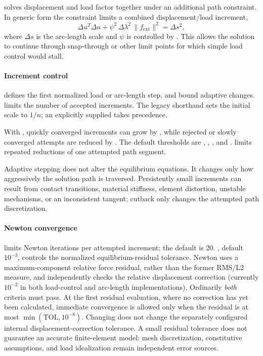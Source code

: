  solves displacement and load factor together under an additional path constraint. In generic form the constraint limits a combined displacement/load increment,
\[
\Delta u^T\Delta u
+\psi^2\,\Delta\lambda^2\,\|f_\mathrm{ext}\|^2
=\Delta s^2,
\]
where \(\Delta s\) is the arc-length scale and \(\psi\) is controlled by . This allows the solution to continue through snap-through or other limit points for which simple load control would stall.

\paragraph*{Increment control}

 defines the first normalized load or arc-length step.  and  bound adaptive changes.  limits the number of accepted increments. The legacy  shorthand sets the initial scale to \(1/n\); an explicitly supplied  takes precedence.

With , quickly converged increments can grow by , while rejected or slowly converged attempts are reduced by . The default thresholds are , , , and .  limits repeated reductions of one attempted path segment.

Adaptive stepping does not alter the equilibrium equations. It changes only how aggressively the solution path is traversed. Persistently small increments can result from contact transitions, material stiffness, element distortion, unstable mechanisms, or an inconsistent tangent; cutback only changes the attempted path discretization.

\paragraph*{Newton convergence}

 limits Newton iterations per attempted increment; the default is 20. , default \(10^{-3}\), controls the normalized equilibrium-residual tolerance. Newton uses a maximum-component relative force residual, rather than the former RMS/L2 measure, and independently checks the relative displacement correction (currently \(10^{-2}\) in both load-control and arc-length implementations). Ordinarily \emph{both} criteria must pass. At the first residual evaluation, where no correction has yet been calculated, immediate convergence is allowed only when the residual is at most \(\min(\mathrm{TOL},10^{-8})\). Changing  does not change the separately configured internal displacement-correction tolerance. A small residual tolerance does not guarantee an accurate finite-element model: mesh discretization, constitutive assumptions, and load idealization remain independent error sources.

